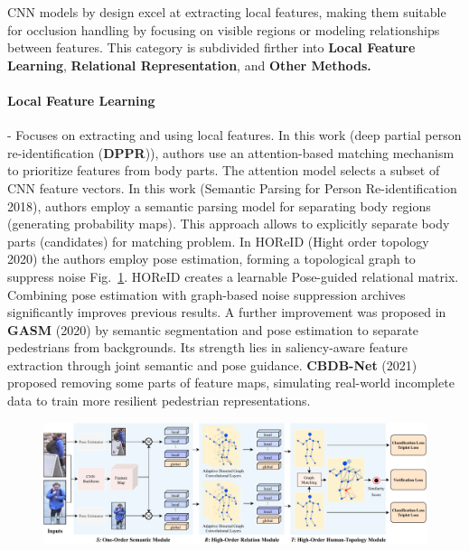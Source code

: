 \documentclass[12pt, a4paper]{article}
\begin{document}
CNN models by design excel at extracting local features, making them suitable for occlusion handling by focusing on visible regions or modeling relationships between features. This category is subdivided firther into \textbf{Local Feature Learning}, \textbf{Relational Representation}, and \textbf{Other Methods.}

\paragraph{Local Feature Learning} - Focuses on extracting and using local features.
In this work \cite{DPPR} (deep partial person re-identification (\textbf{DPPR})), authors use an attention-based matching mechanism to prioritize features from body parts. The attention model selects a subset of CNN feature vectors. 
In this work \cite{SPReID} (Semantic Parsing for Person Re-identification 2018), authors employ a semantic parsing model for separating body regions (generating probability maps). This approach allows to explicitly separate body parts (candidates) for matching problem. In HOReID (Hight order topology 2020) the authors employ pose estimation, forming a topological graph to suppress noise Fig.~\ref{fig:horeid}. HOReID creates a learnable Pose-guided relational matrix. Combining pose estimation with graph-based noise suppression 
archives significantly improves previous results. 
A further improvement was proposed in \textbf{GASM} (2020) \cite{GASM} by semantic segmentation and pose estimation to separate pedestrians from backgrounds. Its strength lies in saliency-aware feature extraction through joint semantic and pose guidance. \textbf{CBDB-Net} (2021) \cite{CBDB-Net} proposed removing some parts of feature maps, simulating real-world incomplete data to train more resilient pedestrian representations.

\begin{figure}[h]
    \centering
    \includegraphics[width=0.9\linewidth]{pictures/HOReid.pdf}
    \label{fig:horeid}
\end{figure}
\end{document}

